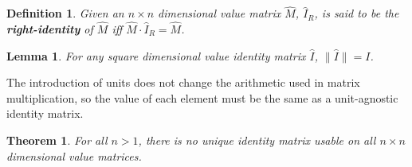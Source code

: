 \documentclass[10pt,letterpaper]{article}
\newtheorem{defn}{Definition}[section]
\newtheorem{lem}{Lemma}[section]
\newtheorem{thm}{Theorem}[section]
\numberwithin{equation}{section}
\begin{document}
\begin{defn}Given an $n \times n$ dimensional value matrix $\hat M$,
  $\hat I_R$, is said to be the \textbf{right-identity} of $\hat M$
  iff $\hat M \cdot \hat I_R = \hat M$.\end{defn}

\begin{lem} \label{dimensional_identities_all_have_the_values_of_I}
  For any square dimensional value identity matrix $\hat I$, $\| \hat
  I \| = I$.\end{lem}

The introduction of units does not change the arithmetic used in
matrix multiplication, so the value of each element must be the same
as a unit-agnostic identity matrix.

\begin{thm}For all $n > 1$, there is no unique identity matrix usable
  on all $n \times n$ dimensional value matrices.\end{thm}
\end{document}
